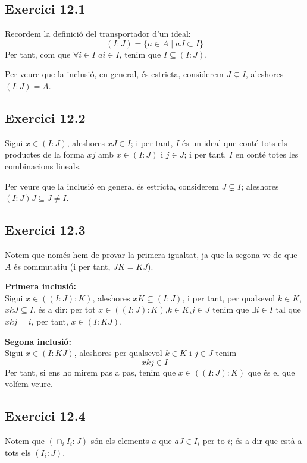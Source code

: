 \documentclass[11pt, a4paper]{article}
\begin{document}
\subsection{Exercici 12.1}
Recordem la definició del transportador d'un ideal:
\[
    (I:J)=\{a\in A\mid aJ\subset I\}
\]
Per tant, com que $\forall i\in I$ $ai\in I$, tenim que $I\subseteq (I:J)$.\par
Per veure que la inclusió, en general, és estricta, considerem $J\subsetneq I$, aleshores $(I:J)=A$.
\subsection{Exercici 12.2}
Sigui $x\in (I:J)$, aleshores $xJ\in I$; i per tant, $I$ és un ideal que conté tots els productes de la forma $x j$ amb $x\in (I:J)$ i $j\in J$; i per tant, $I$ en conté totes les combinacions lineals.\par
Per veure que la inclusió en general és estricta, considerem $J\subsetneq I$; aleshores $(I:J)J\subseteq J\neq I$.
\subsection{Exercici 12.3}
Notem que només hem de provar la primera igualtat, ja que la segona ve de que $A$ és commutatiu (i per tant, $JK=KJ$).\par


\textbf{Primera inclusió:}\\
Sigui $x\in ((I:J):K)$, aleshores $xK\subseteq (I:J)$, i per tant, per qualsevol $k\in K$, $xkJ\subseteq I$, és a dir: per tot $x\in ((I:J):K)$,$k\in K$,$j\in J$ tenim que $\exists i\in I$ tal que $xkj = i$, per tant, $x\in (I:KJ)$.\par
\textbf{Segona inclusió:}\\
Sigui $x\in (I:KJ)$, aleshores per qualsevol $k\in K$ i $j\in J$ tenim
\[
    x kj\in I
\]
Per tant, si ens ho mirem pas a pas, tenim que $x\in ((I:J):K)$ que és el que volíem veure.
\subsection{Exercici 12.4}
Notem que $\left(\cap_i I_i:J\right)$ són els elements $a$ que $aJ\in I_i$ per to $i$; és a dir que està a tots els $(I_i:J)$.
\end{document}
